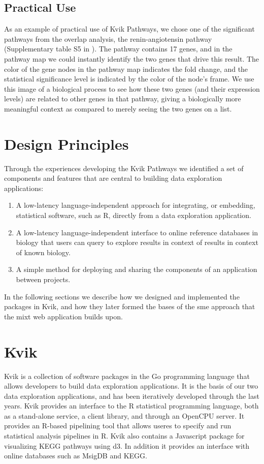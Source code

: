 \subsection{Practical Use} 
As an example of practical use of Kvik Pathways, we chose one of the
significant pathways from the overlap analysis, the renin-angiotensin
pathway (Supplementary table S5 in \cite{olsen2013plasma}). The pathway
contains 17 genes, and in the pathway map we could instantly identify the
two genes that drive this result. The color of the gene nodes in the pathway
map indicates the fold change, and the statistical significance level is
indicated by the color of the node's frame.  We use this image of a
biological process to see how these two genes (and their expression levels)
are related to other genes in that pathway, giving a biologically more
meaningful context as compared to merely seeing the two genes on a list.


\section{Design Principles}\label{challengeref} 
Through the experiences developing the Kvik Pathways we identified a set of
components and features that are central to building data exploration
applications: 

\begin{enumerate}
    \item A low-latency language-independent approach for integrating, or
        embedding, statistical software, such as R, directly from a data
        exploration application. 
    \item A low-latency language-independent interface to online reference
        databases in biology that users can query to explore results in context
        of results in context of known biology. 
    \item A simple method for deploying and sharing the components of an
        application between projects. 
\end{enumerate} 


In the following sections we describe how we designed and implemented the
packages in Kvik, and how they later formed the bases of the \gls{sme} approach
that the \gls{mixt} web application builds upon. 

\section{Kvik}
Kvik is a collection of software packages in the Go programming language that
allows developers to build data exploration applications. It is the basis of our
two data exploration applications, and has been iteratively developed through
the last years. Kvik provides an interface to the R statistical programming
language, both as a stand-alone service, a client library, and through an
OpenCPU server. It provides an R-based pipelining tool that allows useres to
specify and run statistical analysis pipelines in R.  Kvik also contains a
Javascript package for visualizing KEGG pathways using d3.  In addition it
provides an interface with online databases such as MsigDB and KEGG. 

